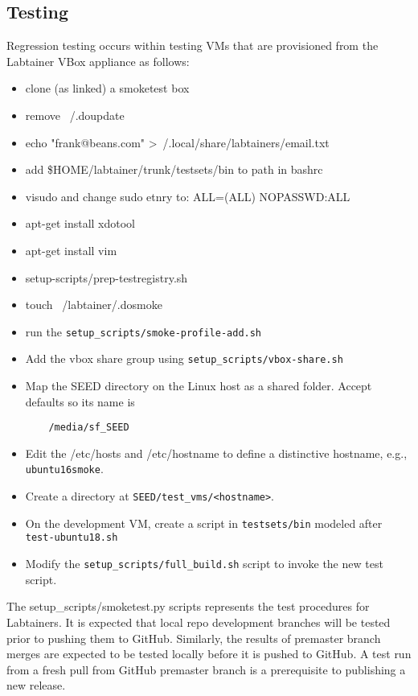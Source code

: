 \documentclass[12pt]{article}
\begin{document}
\subsection{Testing}
Regression testing occurs within testing VMs that are provisioned from the Labtainer VBox appliance as follows:
\begin{itemize}
\item clone (as linked) a smoketest box
\item remove ~/.doupdate
\item echo "frank@beans.com" \textgreater ~/.local/share/labtainers/email.txt
\item add \$HOME/labtainer/trunk/testsets/bin to path in bashrc
\item visudo and change sudo etnry to: ALL=(ALL) NOPASSWD:ALL
\item apt-get install xdotool
\item apt-get install vim
\item setup-scripts/prep-testregistry.sh
\item touch ~/labtainer/.dosmoke
\item run the {\tt setup\_scripts/smoke-profile-add.sh}
\item Add the vbox share group using {\tt setup\_scripts/vbox-share.sh} 
\item Map the SEED directory on the Linux host as a shared folder. Accept defaults so its name is 
\begin{verbatim}
    /media/sf_SEED
\end{verbatim}
\item Edit the /etc/hosts and /etc/hostname to define a distinctive hostname, e.g., {\tt ubuntu16smoke}.
\item Create a directory at {\tt SEED/test\_vms/<hostname>}.  
\item On the development VM, create a script in {\tt testsets/bin} modeled after {\tt test-ubuntu18.sh}
\item Modify the {\tt setup\_scripts/full\_build.sh} script to invoke the new test script.
\end{itemize}


The {setup\_scripts/smoketest.py} scripts represents the test procedures for Labtainers.  
It is expected that local repo development branches will be tested prior to pushing them to GitHub.  Similarly, the
results of premaster branch merges are expected to be tested locally before it is pushed to GitHub. A test run
from a fresh pull from GitHub premaster branch is a prerequisite to publishing a new release.
\end{document}
